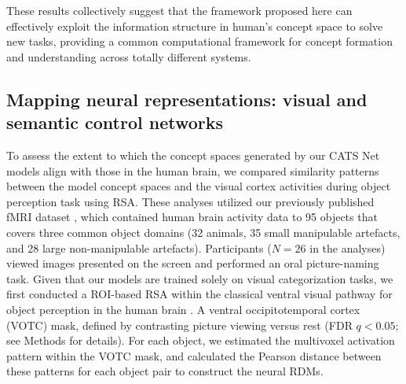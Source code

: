 \documentclass[pdflatex,sn-mathphys-num,lineno]{sn-jnl}%
\begin{document}
\begin{CJK}{UTF8}{gbsn}
These results collectively suggest that the framework proposed here can effectively exploit the information structure in human's concept space to solve new tasks, providing a common computational framework for concept formation and understanding across totally different systems.

\subsection{Mapping neural representations: visual and semantic control networks}

To assess the extent to which the concept spaces generated by our CATS Net models align with those in the human brain, we compared similarity patterns between the model concept spaces and the visual cortex activities during object perception task using RSA. These analyses utilized our previously published fMRI dataset \cite{fu_different_2022}, which contained human brain activity data to 95 objects that covers three common object domains (32 animals, 35 small manipulable artefacts, and 28 large non-manipulable artefacts). Participants ($N=26$ in the analyses) viewed images presented on the screen and performed an oral picture-naming task. Given that our models are trained solely on visual categorization tasks, we first conducted a ROI-based RSA within the classical ventral visual pathway for object perception in the human brain \cite{ungerleider_what_1994}. A ventral occipitotemporal cortex (VOTC) mask, defined by contrasting picture viewing versus rest (FDR $q < 0.05$; see Methods for details). For each object, we estimated the multivoxel activation pattern within the VOTC mask, and calculated the Pearson distance between these patterns for each object pair to construct the neural RDMs. 


\end{CJK}
\end{document}
